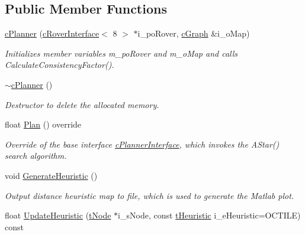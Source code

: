 \subsection*{Public Member Functions}
\begin{DoxyCompactItemize}
\item 
\mbox{\hyperlink{classplanner_1_1c_planner_a4f425d47b277f000d34df04de9995274}{c\+Planner}} (\mbox{\hyperlink{classplanner_1_1c_rover_interface}{c\+Rover\+Interface}}$<$ 8 $>$ $\ast$i\+\_\+po\+Rover, \mbox{\hyperlink{classplanner_1_1c_graph}{c\+Graph}} \&i\+\_\+o\+Map)
\begin{DoxyCompactList}\small\item\em Initializes member variables m\+\_\+po\+Rover and m\+\_\+o\+Map and calls Calculate\+Consistency\+Factor(). \end{DoxyCompactList}\item 
\mbox{\label{classplanner_1_1c_planner_aa9ae1109d3c4b7ac19aef2616547654e}} 
\mbox{\hyperlink{classplanner_1_1c_planner_aa9ae1109d3c4b7ac19aef2616547654e}{$\sim$c\+Planner}} ()
\begin{DoxyCompactList}\small\item\em Destructor to delete the allocated memory. \end{DoxyCompactList}\item 
float \mbox{\hyperlink{classplanner_1_1c_planner_a7c4defd454429503d4e47b552a5311fb}{Plan}} () override
\begin{DoxyCompactList}\small\item\em Override of the base interface \mbox{\hyperlink{classplanner_1_1c_planner_interface}{c\+Planner\+Interface}}, which invokes the A\+Star() search algorithm. \end{DoxyCompactList}\item 
void \mbox{\hyperlink{classplanner_1_1c_planner_a1a4650050656545744796296a653d388}{Generate\+Heuristic}} ()
\begin{DoxyCompactList}\small\item\em Output distance heuristic map to file, which is used to generate the Matlab plot. \end{DoxyCompactList}\item 
float \mbox{\hyperlink{classplanner_1_1c_planner_ad32a7c58b885456ced172b66fed854f0}{Update\+Heuristic}} (\mbox{\hyperlink{structplanner_1_1t_node}{t\+Node}} $\ast$i\+\_\+s\+Node, const \mbox{\hyperlink{classplanner_1_1c_planner_a7f6dc4cbb69dd1ede14a67b0a7bd425b}{t\+Heuristic}} i\+\_\+e\+Heuristic=O\+C\+T\+I\+LE) const

\end{DoxyCompactItemize}
